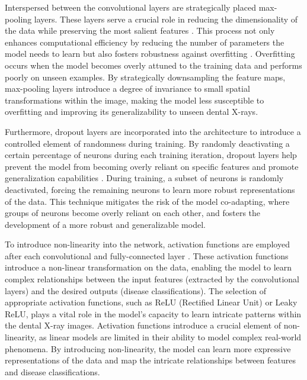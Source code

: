 \documentclass[journal,twoside,web]{ieeecolor}
\begin{document}
Interspersed between the convolutional layers are strategically placed max-pooling layers. These layers serve a crucial role in reducing the dimensionality of the data while preserving the most salient features \cite{srivastava2014dropout}. This process not only enhances computational efficiency by reducing the number of parameters the model needs to learn but also fosters robustness against overfitting \cite{nair2010rectified}. Overfitting occurs when the model becomes overly attuned to the training data and performs poorly on unseen examples. By strategically downsampling the feature maps, max-pooling layers introduce a degree of invariance to small spatial transformations within the image, making the model less susceptible to overfitting and improving its generalizability to unseen dental X-rays.

Furthermore, dropout layers are incorporated into the architecture to introduce a controlled element of randomness during training. By randomly deactivating a certain percentage of neurons during each training iteration, dropout layers help prevent the model from becoming overly reliant on specific features and promote generalization capabilities \cite{srivastava2014dropout}. During training, a subset of neurons is randomly deactivated, forcing the remaining neurons to learn more robust representations of the data. This technique mitigates the risk of the model co-adapting, where groups of neurons become overly reliant on each other, and fosters the development of a more robust and generalizable model.

To introduce non-linearity into the network, activation functions are employed after each convolutional and fully-connected layer \cite{nair2010rectified}. These activation functions introduce a non-linear transformation on the data, enabling the model to learn complex relationships between the input features (extracted by the convolutional layers) and the desired outputs (disease classifications). The selection of appropriate activation functions, such as ReLU (Rectified Linear Unit) or Leaky ReLU, plays a vital role in the model's capacity to learn intricate patterns within the dental X-ray images. Activation functions introduce a crucial element of non-linearity, as linear models are limited in their ability to model complex real-world phenomena. By introducing non-linearity, the model can learn more expressive representations of the data and map the intricate relationships between features and disease classifications.
\end{document}
